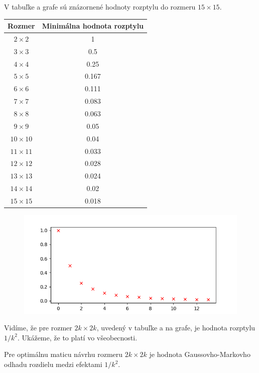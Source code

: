 V tabuľke a grafe sú znázornené hodnoty rozptylu do rozmeru $15 \times 15$.

\begin{center}
\begin{tabular}{ |c|c|}
  \hline
  Rozmer & Minimálna hodnota rozptylu \\ \hline
  $2 \times 2$ & 1 \\ \hline
  $3 \times 3$ & 0.5 \\ \hline
  $4 \times 4$ & 0.25 \\ \hline
  $5 \times 5$ & 0.167 \\ \hline
  $6 \times 6$ & 0.111 \\ \hline
  $7 \times 7$ & 0.083 \\ \hline
  $8 \times 8$ & 0.063 \\ \hline
  $9 \times 9$ & 0.05 \\ \hline
  $10 \times 10$ & 0.04 \\ \hline
  $11 \times 11$ & 0.033 \\ \hline
  $12 \times 12$ & 0.028 \\ \hline
  $13 \times 13$ & 0.024 \\ \hline
  $14 \times 14$ & 0.02 \\ \hline
  $15 \times 15$ & 0.018 \\ \hline
\end{tabular}
\end{center}

\begin{figure}[!h]
  \centering
  \includegraphics{minimalny_rozptyl.png}
\end{figure}

Vidíme, že pre rozmer $2k \times 2k$, uvedený v tabuľke a na grafe, je hodnota rozptylu $1/k^2$. Ukážeme, že to platí vo všeobecnosti.

\begin{prop}
Pre optimálnu maticu návrhu rozmeru $2k \times 2k$ je hodnota Gaussovho-Markovho odhadu rozdielu medzi efektami $1/k^2$.
\end{prop}

